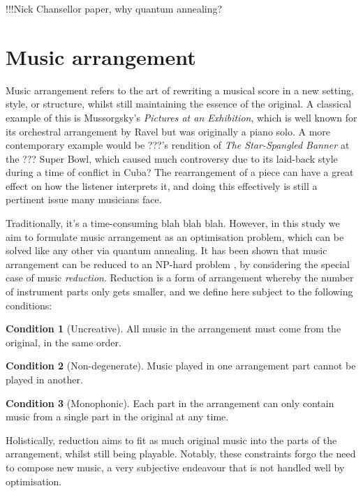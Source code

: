 \documentclass[12pt]{article}
\theoremstyle{definition}
\newtheorem{condition}{Condition}
\begin{document}
!!!Nick Chansellor paper, why quantum annealing?

\section{Music arrangement}
\label{sec:arrangement}

Music arrangement refers to the art of rewriting a musical score in a new setting, style, or structure, whilst still maintaining the essence of the original. A classical example of this is Mussorgsky's \emph{Pictures at an Exhibition}, which is well known for its orchestral arrangement by Ravel but was originally a piano solo. A more contemporary example would be ???'s rendition of \emph{The Star-Spangled Banner} at the ??? Super Bowl, which caused much controversy due to its laid-back style during a time of conflict in Cuba? The rearrangement of a piece can have a great effect on how the listener interprets it, and doing this effectively is still a pertinent issue many musicians face.

Traditionally, it's a time-consuming blah blah blah. However, in this study we aim to formulate music arrangement as an optimisation problem, which can be solved like any other via quantum annealing. It has been shown that music arrangement can be reduced to an NP-hard problem \cite{moses_computational_2016}, by considering the special case of music \emph{reduction}. Reduction is a form of arrangement whereby the number of instrument parts only gets smaller, and we define here subject to the following conditions:

\begin{condition}[Uncreative]
    All music in the arrangement must come from the original, in the same order.
    \label{con:uncreative}
\end{condition}
\begin{condition}[Non-degenerate]
    Music played in one arrangement part cannot be played in another.
    \label{con:non-degenerate}
\end{condition}
\begin{condition}[Monophonic]
    Each part in the arrangement can only contain music from a single part in the original at any time.
    \label{con:monophonic}
\end{condition}

Holistically, reduction aims to fit as much original music into the parts of the arrangement, whilst still being playable. Notably, these constraints forgo the need to compose new music, a very subjective endeavour that is not handled well by optimisation.
\end{document}

